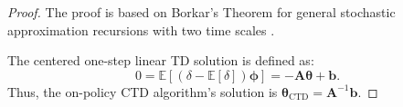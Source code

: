 \begin{proof}
\label{th1proof}   
    The proof is  based on Borkar's Theorem   for
    general stochastic approximation recursions with two time scales
    \cite{borkar1997stochastic}. 
    
    The centered one-step
    linear TD solution is defined
    as: 
    \begin{equation*}
    0=\mathbb{E}[(\delta-\mathbb{E}[\delta]) \bm{\bm{\phi}}]=-\textbf{A}\bm{\bm{\theta}}+\bm{b}.
    \end{equation*}
    Thus, the on-policy CTD algorithm's solution is
    $\bm{\bm{\theta}}_{\text{CTD}}=\textbf{A}^{-1}\bm{b}$.
    

\end{proof}
